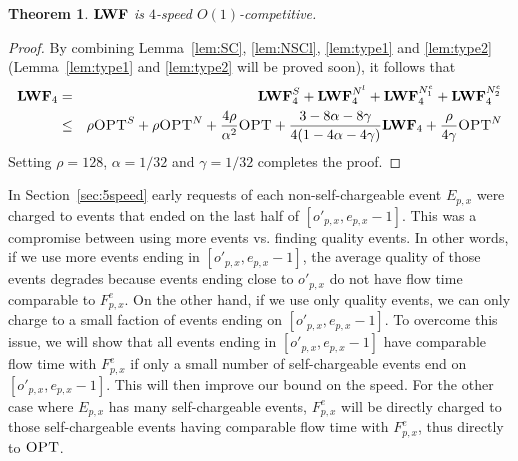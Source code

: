 \documentclass[11pt]{article}
\newtheorem{theorem}[lemma]{Theorem}
\newcommand{\opt}{\textrm{\sc OPT}}
\newcommand{\len}{\mathfrak{\rho}}
\newcommand{\fe}{F^e}
\newcommand{\lwfs}{\lwf^{S}}
\newcommand{\lwfneone}{\lwf^{N_1^e}}
\newcommand{\lwfnetwo}{\lwf^{N_2^e}}
\newcommand{\lwfnl}{\lwf^{N^l}}
\newcommand{\opts}{\opt^{S}}
\newcommand{\optn}{\opt^{N}}
\begin{document}
\begin{titlepage}
\begin{theorem}
\label{thm:4spd} ${\texttt{\bf{LWF}}}$ is $4$-speed $O(1)$-competitive.
\end{theorem}
\begin{proof}
    By combining Lemma~\ref{lem:SC}, \ref{lem:NSCl}, \ref{lem:type1} and \ref{lem:type2} (Lemma~\ref{lem:type1} and \ref{lem:type2} will be proved soon), it follows that
\begin{eqnarray*}
                 \lwf_{4}   &=   & \lwfs_4 + \lwfnl_4 + \lwfneone_4 + \lwfnetwo_4 \\
                            &\leq& \len\opts + \len\optn + \frac{4 \len}{ \alpha^2} \opt + \frac{3 - 8\alpha - 8\gamma}{4(1 - 4\alpha - 4\gamma)} \lwf_4 + \frac{\len}{4\gamma} \optn
\end{eqnarray*}
Setting $\len = 128$, $\alpha = 1/32$ and $\gamma = 1/32$ completes the proof.
\end{proof}



In Section~\ref{sec:5speed} early requests of each non-self-chargeable event $E_{p,x}$ were charged to events that
ended on the last half of $[o'_{p,x}, e_{p,x}-1]$. This was a compromise between using more events vs. finding quality
events. In other words, if we use more events ending in $[o'_{p,x}, e_{p,x}-1]$, the average quality of those events degrades because  events ending close to $o'_{p,x}$ do not have flow time comparable to $\fe_{p,x}$. On the other hand,
if we use only quality events, we can only charge to a small faction of events ending on $[o'_{p,x}, e_{p,x}-1]$. To overcome this issue, we will show that all events
ending in $[o'_{p,x}, e_{p,x}-1]$ have comparable flow time with $\fe_{p,x}$ if only a small number of self-chargeable events end on $[o'_{p,x}, e_{p,x}-1]$.  This will then improve our bound on the speed.   For the other case where $E_{p,x}$ has
many self-chargeable events, $\fe_{p,x}$ will be directly charged to those self-chargeable events having comparable
flow time with $\fe_{p,x}$, thus directly to $\opt$.


\end{titlepage}
\end{document}
